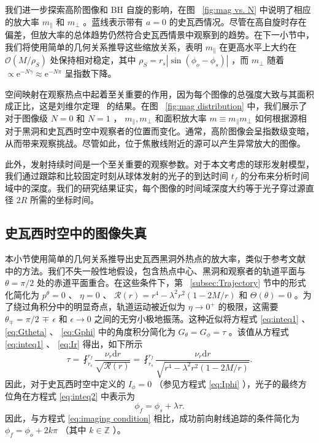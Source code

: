\documentclass[aps,reprint,superscriptaddress,nofootinbib,floatfix,longbibliography,preprintnumbers]{revtex4-1}
\newcommand{\R}{\mathcal{R}}
\newcommand{\dd}{\mathrm{d}}
\newcommand{\ee}{\mathrm{e}}
\begin{document}
我们进一步探索高阶图像和 BH 自旋的影响，在图~    \ref{fig:mag vs. N}    中说明了相应的放大率    $m_{\parallel}$    和    $m_{\perp}$    。蓝线表示带有    $a = 0$    的史瓦西情况。尽管在高自旋时存在偏差，但放大率的总体趋势仍然符合史瓦西情景中观察到的趋势。在下一小节中，我们将使用简单的几何关系推导这些缩放关系，表明    $m_{\parallel}$    在更高水平上大约在    $\mathcal{O}(M/\rho_S)$    处保持相对稳定，其中    $\rho_S = r_s \left|\sin(\phi_o - \phi_s)\right|$    ，而    $m_{\perp}$    随着    $\propto \ee^{-N\gamma} \approx \ee^{-N\pi}$    呈指数下降。  

空间映射在观察热点中起着至关重要的作用，因为每个图像的总强度大致与其面积成正比，这是刘维尔定理~    \cite{Misner:1973prb}    的结果。在图~    \ref{fig:mag distribution}    中，我们展示了对于图像级    $N=0$    和    $N=1$    ，   $m_{\parallel}, m_{\perp}$    和面积放大率    $m \equiv m_{\parallel}m_{\perp}$    如何根据源相对于黑洞和史瓦西时空中观察者的位置而变化。通常，高阶图像会呈指数级变暗，从而带来观察挑战。尽管如此，位于焦散线附近的源可以产生异常放大的图像。  

此外，发射持续时间是一个至关重要的观察参数。对于本文考虑的球形发射模型，我们通过跟踪和比较固定时刻从球体发射的光子的到达时间    $t_f$    的分布来分析时间域中的深度。我们的研究结果证实，每个图像的时间域深度大约等于光子穿过源直径    $2R$    所需的坐标时间。  

   \subsection{史瓦西时空中的图像失真  }    
   \label{subsec:Sch distortion}    本小节使用简单的几何关系推导出史瓦西黑洞外热点的放大率，类似于参考文献~    \cite{Ohanian1987}    中的方法。我们不失一般性地假设，包含热点中心、黑洞和观察者的轨道平面与    $\theta = \pi/2$    处的赤道平面重合。在这些条件下，第~    \ref{subsec:Trajectory}    节中的形式化简化为    $p^{\theta} = 0$    、    $\eta = 0$    、    $\mathcal{R}(r) = r^4 - \lambda^2 r^2(1 - 2M/r)$    和    $\Theta(\theta) = 0$    。为了绕过角积分中的明显奇点，轨道运动被近似为    $\eta \to 0^+$    的极限，这需要    $\theta_{\mp} = \pi/2\,\mp\,\epsilon$    和    $\epsilon \to 0$    之间的无穷小极地振荡。这种近似将方程式    \ref{eq:inteq1}   、   \ref{eq:Gtheta}   、   \ref{eq:Gphi}    中的角度积分简化为    $G_{\theta} = G_{\phi} = \tau$   。该值从方程式    \ref{eq:inteq1}   、   \ref{eq:Ir}    得出，如下所示
   \begin{equation}
    \tau=\fint_{r_s}^{r_f}\frac{\nu_r\dd r}{\sqrt{\R(r)}}=\fint_{r_s}^{r_f}\frac{\nu_r\dd r}{\sqrt{r^4-\lambda^2r^2(1-2M/r)}}.\label{eq:tauS}
\end{equation}    因此，对于史瓦西时空中定义的    $I_{\phi} = 0$   （参见方程式    \ref{eq:Iphi}   ），光子的最终方位角在方程式    \ref{eq:inteq2}    中表示为
   \begin{equation}
\phi_f = \phi_s + \lambda \tau.\label{eq:phifS}
\end{equation}    因此，与方程式    \ref{eq:imaging condition}    相比，成功前向射线追踪的条件简化为    $\phi_f = \phi_o + 2k\pi$   （其中    $k \in \mathbb{Z}$   ）。  
\end{document}
